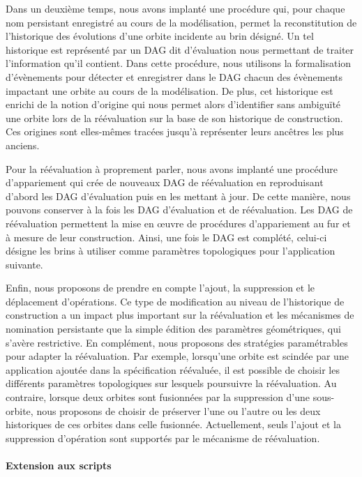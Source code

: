 Dans un deuxième temps, nous avons implanté une procédure qui, pour chaque nom
persistant enregistré au cours de la modélisation, permet la reconstitution de
l'historique des évolutions d'une orbite incidente au brin désigné. %
Un tel historique est représenté par un DAG dit d'évaluation nous permettant de
traiter l'information qu'il contient. %
Dans cette procédure, nous utilisons la formalisation d'évènements pour détecter
et enregistrer dans le DAG chacun des évènements impactant une orbite au cours
de la modélisation. %
De plus, cet historique est enrichi de la notion d'origine qui nous permet alors
d'identifier sans ambiguïté une orbite lors de la réévaluation sur la base de son
historique de construction. %
Ces origines sont elles-mêmes tracées jusqu'à représenter leurs ancêtres les plus
anciens. %

Pour la réévaluation à proprement parler, nous avons implanté une
procédure d'appariement qui crée de nouveaux DAG de réévaluation en reproduisant
d'abord les DAG d'évaluation puis en les mettant à jour. %
De cette manière, nous pouvons conserver à la fois les DAG d'évaluation et de
réévaluation. %
Les DAG de réévaluation permettent la mise en \oe uvre de procédures
d'appariement au fur et à mesure de leur construction. %
Ainsi, une fois le DAG est complété, celui-ci désigne les brins à utiliser comme
paramètres topologiques pour l'application suivante. %

Enfin, nous proposons de prendre en compte l'ajout, la suppression et le
déplacement d'opérations. %
Ce type de modification au niveau de l'historique de construction a un impact
plus important sur la réévaluation et les mécanismes
de nomination persistante que la simple édition des paramètres géométriques,
qui s'avère restrictive. %
En complément, nous proposons des stratégies paramétrables pour adapter la réévaluation. %
Par exemple, lorsqu'une orbite est scindée par une application ajoutée dans la
spécification réévaluée, il est possible de choisir les différents paramètres
topologiques sur lesquels poursuivre la réévaluation. %
Au contraire, lorsque deux orbites sont fusionnées par la suppression d'une
sous-orbite, nous proposons de choisir de préserver l'une ou
l'autre ou les deux historiques de ces orbites dans celle fusionnée. %
Actuellement, seuls l'ajout et la suppression d'opération sont supportés par le
mécanisme de réévaluation. %



\paragraph*{Extension aux scripts}



